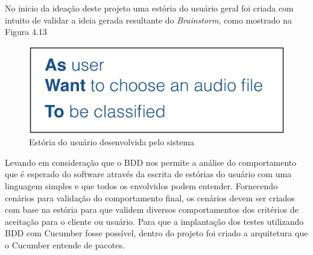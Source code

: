 No inicio da ideação deste projeto uma estória do usuário geral foi criada com intuito de validar a ideia gerada resultante do \textit{Brainstorm}, como mostrado na Figura 4.13


\begin{figure}[H]
	\centering
	\captionsetup{justification=centering,margin=2cm}
	\includegraphics[scale=0.65]{capitulos/validacao/figuras/estoriaDoUsuarioDaAplicacao.eps}
	\caption{Estória do usuário desenvolvida pelo sistema}
	\label{fig:result-engajamento}
\end{figure}

Levando em consideração que o BDD nos permite a análise do comportamento que é esperado do software através da escrita de estórias do usuário com uma linguagem simples e que todos os envolvidos podem entender. Fornecendo cenários para validação do comportamento final, os cenários devem ser criados com base na estória para que validem diversos comportamentos dos critérios de aceitação para o cliente ou usuário. Para que a implantação dos testes utilizando BDD com Cucumber fosse possível, dentro do projeto foi criado a arquitetura que o Cucumber entende de pacotes.

